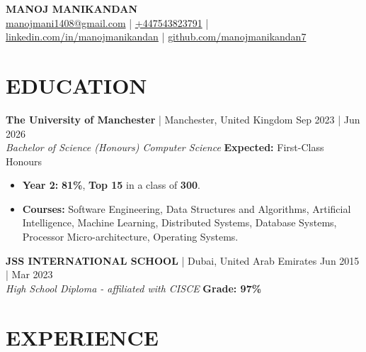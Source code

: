 \documentclass[a4paper,1.5pt]{extarticle}
\begin{document}
\pagestyle{empty}

\begin{center}
\textbf{\Large MANOJ MANIKANDAN}\\[2pt] %
\href{mailto:manojmani1408@gmail.com}{manojmani1408@gmail.com} | \href{tel:447543823791}{+447543823791}  | \href{https://www.linkedin.com/in/manojmanikandan}{linkedin.com/in/manojmanikandan}  |  \href{https://github.com/manojmanikandan7}{github.com/manojmanikandan7}
\end{center}
\section*{EDUCATION}
\textbf{The University of Manchester} | Manchester, United Kingdom \hfill Sep 2023 | Jun 2026\\ %
\textit{Bachelor of Science (Honours) Computer Science} \hfill \textbf{Expected:} First-Class Honours%
\begin{itemize}
    \item \textbf{Year 2: } \textbf{81\%}, \textbf{Top 15} in a class of \textbf{300}.
    \item \textbf{Courses:} Software Engineering, Data Structures and Algorithms, Artificial Intelligence, Machine Learning, Distributed Systems, Database Systems, Processor Micro-architecture, Operating Systems. %
\end{itemize}

\noindent
\textbf{JSS INTERNATIONAL SCHOOL} | Dubai, United Arab Emirates \hfill Jun 2015 | Mar 2023\\ %
\textit{High School Diploma - affiliated with CISCE} \hfill \textbf{Grade: 97\%} %


\section*{EXPERIENCE}
\end{document}
